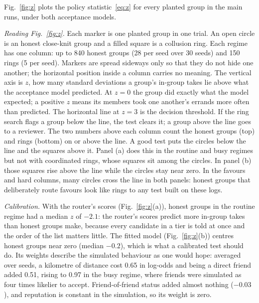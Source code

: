 Fig.~\ref{fig:z} plots the policy statistic~\eqref{eq:z} for every planted group in the
main runs, under both acceptance models.

\emph{Reading Fig.~\ref{fig:z}.} Each marker is one planted group in one trial. An
open circle is an honest close-knit group and a filled square is a collusion ring.
Each regime has one column: up to 840 honest groups (28 per seed over 30 seeds) and
150 rings (5 per seed). Markers are spread sideways only so that they do not hide one
another; the horizontal position inside a column carries no meaning. The vertical
axis is $z$, how many standard deviations a group's in-group takes lie above what the
acceptance model predicted. At $z=0$ the group did exactly what the model expected;
a positive $z$ means its members took one another's errands more often than
predicted. The horizontal line at $z=3$ is the decision threshold. If the ring search
flags a group below the line, the test clears it; a group above the line goes to a
reviewer. The two numbers above each column count the honest groups (top) and rings
(bottom) on or above the line. A good test puts the circles below the line and the
squares above it. Panel (a) does this in the routine and busy regimes but not with
coordinated rings, whose squares sit among the circles. In panel (b) those squares
rise above the line while the circles stay near zero. In the favours and hard
columns, many circles cross the line in both panels: honest groups that deliberately
route favours look like rings to any test built on these logs.

\emph{Calibration.} With the router's scores (Fig.~\ref{fig:z}(a)), honest groups in
the routine regime had a median $z$ of $-2.1$: the router's scores predict more
in-group takes than honest groups make, because every candidate in a tier is told at
once and the order of the list matters little. The fitted model
(Fig.~\ref{fig:z}(b)) centres honest groups near zero (median $-0.2$), which is what
a calibrated test should do. Its weights describe the simulated behaviour as one would
hope: averaged over seeds, a kilometre of distance cost 0.65 in log-odds and being a
direct friend added 0.51, rising to 0.97 in the busy regime, where friends were
simulated as four times likelier to accept. Friend-of-friend status added almost
nothing ($-0.03$), and reputation is constant in the simulation, so its weight is
zero.


